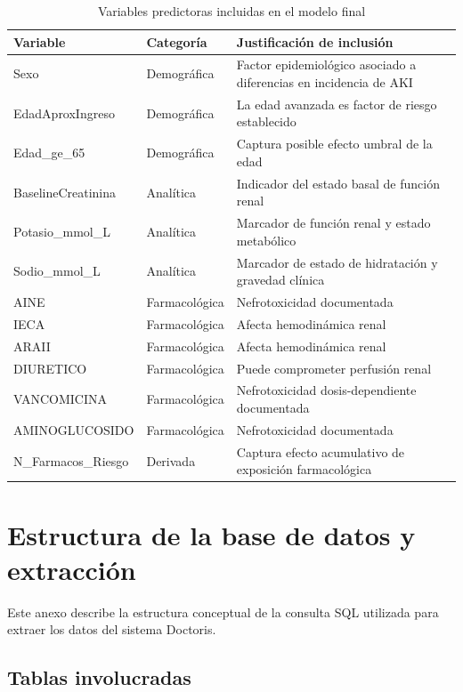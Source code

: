 \documentclass[12pt, a4paper, oneside]{report}
\begin{document}
\begin{table}[h]
\centering
\begin{tabular}{llp{8cm}}
\hline
\textbf{Variable} & \textbf{Categoría} & \textbf{Justificación de inclusión} \\
\hline
Sexo & Demográfica & Factor epidemiológico asociado a diferencias en incidencia de AKI \\
EdadAproxIngreso & Demográfica & La edad avanzada es factor de riesgo establecido \\
Edad\_ge\_65 & Demográfica & Captura posible efecto umbral de la edad \\
BaselineCreatinina & Analítica & Indicador del estado basal de función renal \\
Potasio\_mmol\_L & Analítica & Marcador de función renal y estado metabólico \\
Sodio\_mmol\_L & Analítica & Marcador de estado de hidratación y gravedad clínica \\
AINE & Farmacológica & Nefrotoxicidad documentada \\
IECA & Farmacológica & Afecta hemodinámica renal \\
ARAII & Farmacológica & Afecta hemodinámica renal \\
DIURETICO & Farmacológica & Puede comprometer perfusión renal \\
VANCOMICINA & Farmacológica & Nefrotoxicidad dosis-dependiente documentada \\
AMINOGLUCOSIDO & Farmacológica & Nefrotoxicidad documentada \\
N\_Farmacos\_Riesgo & Derivada & Captura efecto acumulativo de exposición farmacológica \\
\hline
\end{tabular}
\caption{Variables predictoras incluidas en el modelo final}
\label{tab:variables_modelo}
\end{table}


\chapter{Estructura de la base de datos y extracción}
\label{anexo:sql}

Este anexo describe la estructura conceptual de la consulta SQL utilizada para extraer los datos del sistema Doctoris.

\section{Tablas involucradas}
\end{document}
